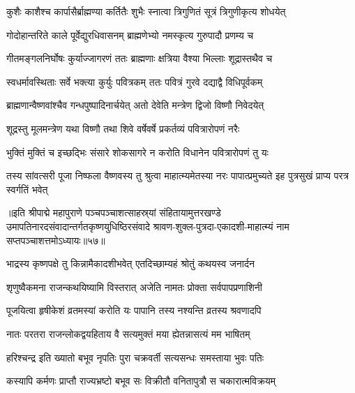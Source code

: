 \twolineshloka
{कुशैः काशैश्च कार्पासैर्ब्राह्मण्या कर्तितैः शुभैः}
{स्नात्वा त्रिगुणितं सूत्रं त्रिगुणीकृत्य शोधयेत्}%

\twolineshloka
{गोदोहान्तरिते काले पूर्वेद्युरधिवासनम्}
{ब्राह्मणेभ्यो नमस्कृत्य गुरुपादौ प्रणम्य च}%

\twolineshloka
{गीतमङ्गलनिर्घोषः कुर्याज्जागरणं ततः}
{ब्राह्मणाः क्षत्रिया वैश्या भिल्लाः शूद्रास्तथैव च}%

\twolineshloka
{स्वधर्मावस्थिताः सर्वे भक्त्या कुर्युः पवित्रकम्}
{ततः पवित्रं गुरवे दद्याद्वै विधिपूर्वकम्}%

\twolineshloka
{ब्राह्मणान्वैष्णवांश्चैव गन्धपुष्पादिनार्चयेत्}
{अतो देवेति मन्त्रेण द्विजो विष्णौ निवेदयेत्}%

\twolineshloka
{शूद्रस्तु मूलमन्त्रेण यथा विष्णौ तथा शिवे}
{वर्षेवर्षे प्रकर्तव्यं पवित्रारोपणं नरैः}%

\twolineshloka
{भुक्तिं मुक्तिं च इच्छद्भिः संसारे शोकसागरे}
{न करोति विधानेन पवित्रारोपणं तु यः}%

\threelineshloka
{तस्य सांवत्सरी पूजा निष्फला वैष्णवस्य तु}
{श्रुत्वा माहात्म्यमेतस्या नरः पापात्प्रमुच्यते}
{इह पुत्रसुखं प्राप्य परत्र स्वर्गतिं भवेत्}%

॥इति श्रीपाद्मे महापुराणे पञ्चपञ्चाशत्साहस्र्यां संहितायामुत्तरखण्डे उमापतिनारदसंवादान्तर्गतकृष्णयुधिष्ठिरसंवादे श्रावण-शुक्ल-पुत्रदा-एकादशी-माहात्म्यं नाम सप्तपञ्चाशत्तमोऽध्यायः॥५७॥


\hyperref[sec:ekadashi_mahatmyam_padma_puranam]{\closesub}
\clearpage

\label{sec:padma-bhadrapada-krishnaja}



\twolineshloka
{भाद्रस्य कृष्णपक्षे तु किन्नामैकादशीभवेत्}
{एतदिच्छाम्यहं श्रोतुं कथयस्व जनार्दन}%


\twolineshloka
{शृणुष्वैकमना राजन्कथयिष्यामि विस्तरात्}
{अजेति नामतः प्रोक्ता सर्वपापप्रणाशिनी}%

\twolineshloka
{पूजयित्वा हृषीकेशं व्रतमस्यां करोति यः}
{पापानि तस्य नश्यन्ति व्रतस्य श्रवणादपि}%

\twolineshloka
{नातः परतरा राजन्लोकद्वयहिताय वै}
{सत्यमुक्तं मया ह्येतन्नासत्यं मम भाषितम्}%

\twolineshloka
{हरिश्चन्द्र इति ख्यातो बभूव नृपतिः पुरा}
{चक्रवर्ती सत्यसन्धः समस्ताया भुवः पतिः}%

\twolineshloka
{कस्यापि कर्मणः प्राप्तौ राज्यभ्रष्टो बभूव सः}
{विक्रीतौ वनितापुत्रौ स चकारात्मविक्रयम्}%

